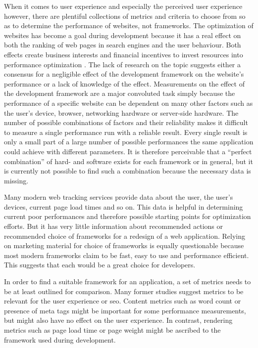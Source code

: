 \documentclass[a4paper, 12pt]{article}
\begin{document}
When it comes to user experience and especially the perceived user experience however, there are plentiful collections of metrics and criteria to choose from so as to determine the performance of websites, not frameworks.
The optimization of websites has become a goal during development because it has a real effect on both the ranking of web pages in search engines and the user behaviour.
Both effects create business interests and financial incentives to invest resources into performance optimization \citep{webprophet,effectsofwebpagecontents}.
The lack of research on the topic suggests either a consensus for a negligible effect of the development framework on the website's performance or a lack of knowledge of the effect.
Measurements on the effect of the development framework are a major convoluted task simply because the performance of a specific website can be dependent on many other factors such as the user's device, browser, networking hardware or server-side hardware.
The number of possible combinations of factors and their reliability makes it difficult to measure a single performance run with a reliable result.
Every single result is only a small part of a large number of possible performances the same application could achieve with different parameters.
It is therefore perceivable that a \enquote{perfect combination} of hard- and software exists for each framework or in general, but it is currently not possible to find such a combination because the necessary data is missing.

Many modern web tracking services provide data about the user, the user's devices, current page load times and so on.
This data is helpful in determining current poor performances and therefore possible starting points for optimization efforts.
But it has very little information about recommended actions or recommended choice of frameworks for a redesign of a web application.
Relying on marketing material for choice of frameworks is equally questionable because most modern frameworks claim to be fast, easy to use and performance efficient.
This suggests that each would be a great choice for developers.

In order to find a suitable framework for an application, a set of metrics needs to be at least outlined for comparison.
Many former studies suggest metrics to be relevant for the user experience or \acrlong{seo}.
Content metrics such as word count or presence of meta tags might be important for some performance measurements, but might also have no effect on the user experience.
In contrast, rendering metrics such as page load time or page weight might be ascribed to the framework used during development.
\end{document}
